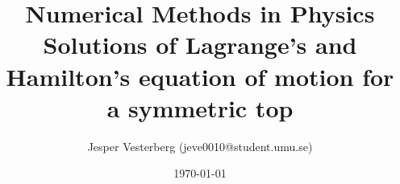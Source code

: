 \title{Numerical Methods in Physics \\ Solutions of Lagrange's and Hamilton's equation of motion for a symmetric top}
\author{Jesper Vesterberg (jeve0010@student.umu.se)}
\date{\today}

\begin{titlepage}
  \maketitle
  \thispagestyle{fancy}
  \rhead{\today}
\end{titlepage}
